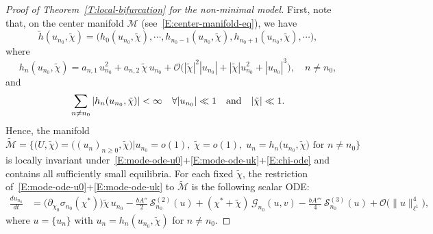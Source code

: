 \documentclass[11pt]{article} %
\theoremstyle{remark}
\theoremstyle{remark}
\numberwithin{equation}{section}
\numberwithin{figure}{section}
\numberwithin{table}{section}
\begin{document}
\begin{proof}[Proof of Theorem~\ref{T:local-bifurcation}  for the non-minimal model]
  First, note that, on the center manifold $\mathcal{M}$
  (see~\eqref{E:center-manifold-eq}), we have
  \[
    \tilde{h}(u_{n_0},\tilde{\chi})=\big(h_0(u_{n_0},\tilde{\chi}), \cdots,
    h_{n_0-1}(u_{n_0},\tilde{\chi}),h_{n_0+1}(u_{n_0},\tilde{\chi}),\cdots),
  \]
  where
  \[
    h_n(u_{n_0},\tilde{\chi}) =
    a_{n,1}\,u_{n_0}^2
    + a_{n,2}\,\tilde{\chi}\,u_{n_0}
    + \mathcal{O}\big(|\tilde{\chi}|^2 |u_{n_0}| +|\tilde{\chi}| u_{n_0}^2 +
    |u_{n_0}|^3\big),
    \quad n \ne n_0,
  \]
  and
  \[
    \sum_{n\not = n_0}|h_n(u_{n_0},\tilde{\chi})|<\infty\quad\forall |u_{n_0}|\ll
    1 \quad {\rm and}\quad |\tilde{\chi}|\ll 1.
  \]
  Hence, the manifold
  \[
    \widetilde{\mathcal{M}}
    = \Big\{ \big(U,\tilde{\chi}\big) =\big( (u_n)_{n\ge0},\tilde{\chi}\big) \big|
    u_{n_0} = o(1),\; \tilde{\chi} = o(1),\;u_n =
    h_n\big(u_{n_0},\tilde{\chi}\big) \text{ for } n \ne n_0 \Big\}
  \]
  is locally invariant
  under~\eqref{E:mode-ode-u0}+\eqref{E:mode-ode-uk}+\eqref{E:chi-ode} and
  contains all sufficiently small equilibria. For each fixed $\widetilde{\chi}$,
  the restriction of~\eqref{E:mode-ode-u0}+\eqref{E:mode-ode-uk} to
  $\widetilde{\mathcal{M}}$ is the following scalar ODE:
  \begin{align}\label{E:center-ODE-initial}
    \frac{d u_{n_0}}{dt}
    & = \big(\partial_{\chi_0}\sigma_{n_0}(\chi^*)\big)\tilde{\chi}\,u_{n_0}
    - \frac{bA''}{2}\,\mathcal{S}^{(2)}_{n_0}(u)
    + (\chi^*+\tilde{\chi})\,\mathcal{G}_{n_0}(u,v)
    - \frac{bA'''}{4}\,\mathcal{S}^{(3)}_{n_0}(u)
    + \mathcal{O}\big(\|u\|_{\ell^1}^4\big),
  \end{align}
  where $u = \{u_n\}$ with $u_n = h_n(u_{n_0}, \tilde{\chi})$ for $n\not = n_0$.


  \smallskip


\end{proof}
\end{document}

